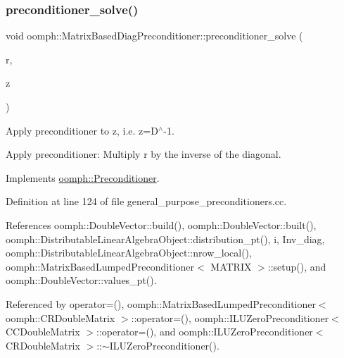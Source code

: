 \subsubsection{\texorpdfstring{preconditioner\+\_\+solve()}{preconditioner\_solve()}}
{\footnotesize\ttfamily void oomph\+::\+Matrix\+Based\+Diag\+Preconditioner\+::preconditioner\+\_\+solve (\begin{DoxyParamCaption}\item[{const \hyperlink{classoomph_1_1DoubleVector}{Double\+Vector} \&}]{r,  }\item[{\hyperlink{classoomph_1_1DoubleVector}{Double\+Vector} \&}]{z }\end{DoxyParamCaption})\hspace{0.3cm}{\ttfamily [virtual]}}



Apply preconditioner to z, i.\+e. z=D$^\wedge$-\/1. 

Apply preconditioner\+: Multiply r by the inverse of the diagonal. 

Implements \hyperlink{classoomph_1_1Preconditioner_ace1199369e4465cd2b9a34884bb64ec8}{oomph\+::\+Preconditioner}.



Definition at line 124 of file general\+\_\+purpose\+\_\+preconditioners.\+cc.



References oomph\+::\+Double\+Vector\+::build(), oomph\+::\+Double\+Vector\+::built(), oomph\+::\+Distributable\+Linear\+Algebra\+Object\+::distribution\+\_\+pt(), i, Inv\+\_\+diag, oomph\+::\+Distributable\+Linear\+Algebra\+Object\+::nrow\+\_\+local(), oomph\+::\+Matrix\+Based\+Lumped\+Preconditioner$<$ M\+A\+T\+R\+I\+X $>$\+::setup(), and oomph\+::\+Double\+Vector\+::values\+\_\+pt().



Referenced by operator=(), oomph\+::\+Matrix\+Based\+Lumped\+Preconditioner$<$ oomph\+::\+C\+R\+Double\+Matrix $>$\+::operator=(), oomph\+::\+I\+L\+U\+Zero\+Preconditioner$<$ C\+C\+Double\+Matrix $>$\+::operator=(), and oomph\+::\+I\+L\+U\+Zero\+Preconditioner$<$ C\+R\+Double\+Matrix $>$\+::$\sim$\+I\+L\+U\+Zero\+Preconditioner().

\mbox{\label{classoomph_1_1MatrixBasedDiagPreconditioner_abdc2e202dcf014e49373b4c180033d29}} 
